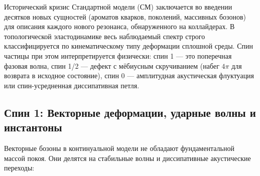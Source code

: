 \documentclass[11pt,a4paper]{article}
\begin{document}
	Исторический кризис Стандартной модели (СМ) заключается во введении десятков новых сущностей (ароматов кварков, поколений, массивных бозонов) для описания каждого нового резонанса, обнаруженного на коллайдерах. В топологической эластодинамике весь наблюдаемый спектр строго классифицируется по кинематическому типу деформации сплошной среды. Спин частицы при этом интерпретируется физически: спин 1 — это поперечная фазовая волна, спин 1/2 — дефект с мёбиусным скручиванием (набег $4\pi$ для возврата в исходное состояние), спин 0 — амплитудная акустическая флуктуация или спин-усредненная диссипативная петля.
	
\subsection{Спин 1: Векторные деформации, ударные волны и инстантоны}
Векторные бозоны в континуальной модели не обладают фундаментальной массой покоя. Они делятся на стабильные волны и диссипативные акустические переходы:
\end{document}
